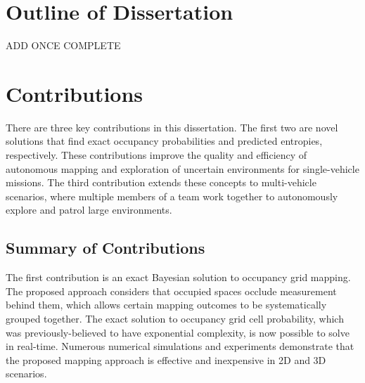 \documentclass[thesis]{thesis-gwu}
\begin{document}
\section{Outline of Dissertation}

ADD ONCE COMPLETE

\section{Contributions}

There are three key contributions in this dissertation. The first two are novel solutions that find exact occupancy probabilities and predicted entropies, respectively. These contributions improve the quality and efficiency of autonomous mapping and exploration of uncertain environments for single-vehicle missions. The third contribution extends these concepts to multi-vehicle scenarios, where multiple members of a team work together to autonomously explore and patrol large environments.




\subsection{Summary of Contributions}

The first contribution is an exact Bayesian solution to occupancy grid mapping. The proposed approach considers that occupied spaces occlude measurement behind them, which allows certain mapping outcomes to be systematically grouped together. The exact solution to occupancy grid cell probability, which was previously-believed to have exponential complexity, is now possible to solve in real-time. Numerous numerical simulations and experiments demonstrate that the proposed mapping approach is effective and inexpensive in 2D and 3D scenarios.

\end{document}
